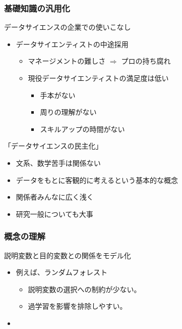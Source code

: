 \documentclass[12pt, dvipdfmx]{beamer}
\begin{document}
\begin{frame}
    \frametitle{基礎知識の汎用化}
        \begin{exampleblock}{データサイエンスの企業での使いこなし}
            \begin{itemize}
                \item データサイエンティストの中途採用
                \begin{itemize}
                    \item マネージメントの難しさ $\Rightarrow$ プロの持ち腐れ
                    \item 現役データサイエンティストの満足度は低い
                    \begin{itemize}
                        \item 手本がない
                        \item 周りの理解がない
                        \item スキルアップの時間がない
                    \end{itemize}
                \end{itemize}
            \end{itemize}
        \end{exampleblock}
        \begin{alertblock}{「データサイエンスの民主化」}
            \begin{itemize}
                \item 文系、数学苦手は関係ない
                \item データをもとに客観的に考えるという基本的な概念
                \item 関係者みんなに広く浅く
                \item 研究一般についても大事
            \end{itemize}
        \end{alertblock}
\end{frame}


\begin{frame}
    \frametitle{概念の理解}
        説明変数と目的変数との関係をモデル化
        \begin{itemize}
            \item 例えば、ランダムフォレスト
            \begin{itemize}
                \item 説明変数の選択への制約が少ない。
                \item 過学習を影響を排除しやすい。
            \end{itemize}
            \item 
            
        \end{itemize}

\end{frame}
\end{document}
